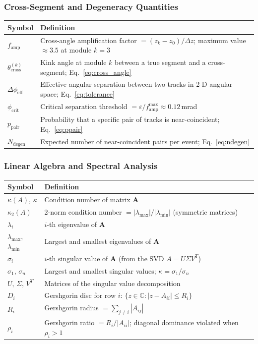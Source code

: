 \documentclass[12pt,a4paper]{article}
\newcommand{\eps}{\varepsilon}
\begin{document}
\subsubsection*{Cross-Segment and Degeneracy Quantities}
\begin{tabular}{@{}lp{10.5cm}@{}}
  \toprule
  Symbol & Definition \\
  \midrule
  $f_\text{amp}$ & Cross-angle amplification factor $= (z_k - z_0)/\Delta z$; maximum value $\approx 3.5$ at module $k{=}3$ \\
  $\theta_\text{cross}^{(k)}$ & Kink angle at module $k$ between a true segment and a cross-segment; Eq.~\eqref{eq:cross_angle} \\
  $\Delta\phi_\text{eff}$ & Effective angular separation between two tracks in 2-D angular space; Eq.~\eqref{eq:tolerance} \\
  $\phi_\text{crit}$ & Critical separation threshold $= \eps / f_\text{amp}^{\max} \approx 0.12$\,mrad \\
  $p_\text{pair}$ & Probability that a specific pair of tracks is near-coincident; Eq.~\eqref{eq:ppair} \\
  $N_\text{degen}$ & Expected number of near-coincident pairs per event; Eq.~\eqref{eq:ndegen} \\
  \bottomrule
\end{tabular}

\bigskip
\subsubsection*{Linear Algebra and Spectral Analysis}
\begin{tabular}{@{}lp{10.5cm}@{}}
  \toprule
  Symbol & Definition \\
  \midrule
  $\kappa(A)$, $\kappa$ & Condition number of matrix $\mathbf{A}$ \\
  $\kappa_2(A)$ & 2-norm condition number $= |\lambda_\text{max}|/|\lambda_\text{min}|$ (symmetric matrices) \\
  $\lambda_i$ & $i$-th eigenvalue of $\mathbf{A}$ \\
  $\lambda_\text{max}$, $\lambda_\text{min}$ & Largest and smallest eigenvalues of $\mathbf{A}$ \\
  $\sigma_i$ & $i$-th singular value of $\mathbf{A}$ (from the SVD $A = U\Sigma V^T$) \\
  $\sigma_1$, $\sigma_n$ & Largest and smallest singular values; $\kappa = \sigma_1/\sigma_n$ \\
  $U$, $\Sigma$, $V^T$ & Matrices of the singular value decomposition \\
  $D_i$ & Gershgorin disc for row $i$: $\{z \in \mathbb{C} : |z - A_{ii}| \leq R_i\}$ \\
  $R_i$ & Gershgorin radius $= \sum_{j\neq i}|A_{ij}|$ \\
  $\rho_i$ & Gershgorin ratio $= R_i / |A_{ii}|$; diagonal dominance violated when $\rho_i > 1$ \\
  \bottomrule
\end{tabular}
\end{document}

